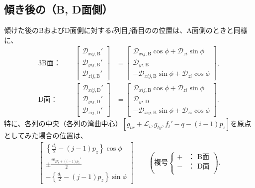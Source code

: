 \subsection{傾き後の\dimple（B, D面側）}
傾けた後のBおよびD面側に対する$i$列目$j$番目の\dimple の位置は、A面側のときと同様に、
\begin{alignat*}{3}
  \text{B面：}&~~&
  \left[
    \begin{array}{c}
      \mathcal D_{xij,\mathrm B}'\\
      \mathcal D_{yij,\mathrm B}'\\
      \mathcal D_{zij,\mathrm B}'
    \end{array}
  \right]
 &= \left[
    \begin{array}{c}
      \mathcal D_{xij,\mathrm B}\cos\phi+\mathcal D_{zi}\sin\phi\\
      \mathcal D_{yi,\mathrm B}\\
      -\mathcal D_{xij,\mathrm B}\sin\phi+\mathcal D_{zi}\cos\phi
    \end{array}
    \right],\\[2pt]
  \text{D面：}&~~&
  \left[
    \begin{array}{c}
      \mathcal D_{xij,\mathrm D}'\\
      \mathcal D_{yij,\mathrm D}'\\
      \mathcal D_{zij,\mathrm D}'
    \end{array}
  \right]
 &= \left[
    \begin{array}{c}
      \mathcal D_{xij,\mathrm B}\cos\phi+\mathcal D_{zi}\sin\phi\\
      \mathcal D_{yi,\mathrm D}\\
      -\mathcal D_{xij,\mathrm B}\sin\phi+\mathcal D_{zi}\cos\phi
    \end{array}
    \right].
\end{alignat*}
特に、各列の中央（各列の湾曲中心）$[g_{tx}+\mathcal L_i, g_{ty}, f_t'-q-(i-1)p_z]$を原点としてみた場合の位置は、
\begin{align*}
  \left[
  \begin{array}{c}
    \displaystyle \left\{\frac{d_i}2-(j-1)p_z\right\}\cos\phi\\
    \displaystyle \pm\frac{w_{Bq+(i-1)p_z}'}2\\
    \displaystyle -\left\{\frac{d_i}2-(j-1)p_z\right\}\sin\phi
  \end{array}
  \right]\qquad
  \left(
  \text{複号}
  \left\{
  \begin{array}{rl}
    \!+\!\!\!& \text{： B面}\\
    \!-\!\!\!& \text{： D面}\\
  \end{array}
  \right.
  \right).
\end{align*}



